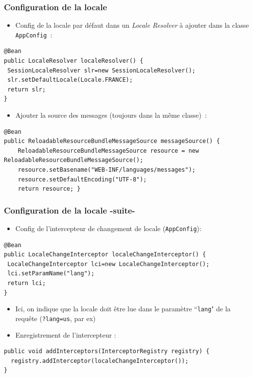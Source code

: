 \documentclass{beamer}
\begin{document}
\begin{frame}[fragile]
	\frametitle{Configuration de la locale}
	\begin{itemize}
		\item Config de la locale par défaut dans un \textit{Locale Resolver} à ajouter dans la classe \texttt{AppConfig}~:
\end{itemize}

\begin{lstlisting}
@Bean
public LocaleResolver localeResolver() {
 SessionLocaleResolver slr=new SessionLocaleResolver();
 slr.setDefaultLocale(Locale.FRANCE);
 return slr;
}
\end{lstlisting}
	\begin{itemize}
		
\item Ajouter la source des messages (toujours dans la même classe)~:
\end{itemize}

\begin{lstlisting}
@Bean
public ReloadableResourceBundleMessageSource messageSource() {
	ReloadableResourceBundleMessageSource resource = new ReloadableResourceBundleMessageSource();
	resource.setBasename("WEB-INF/languages/messages");
	resource.setDefaultEncoding("UTF-8");
	return resource; }
\end{lstlisting}
\end{frame} 

\begin{frame}[fragile]
	\frametitle{Configuration de la locale -suite-}
	\begin{itemize}
		\item Config de l'intercepteur de changement de locale (\texttt{AppConfig}):
\end{itemize}

\begin{lstlisting}
@Bean
public LocaleChangeInterceptor localeChangeInterceptor() {
 LocaleChangeInterceptor lci=new LocaleChangeInterceptor();
 lci.setParamName("lang");
 return lci;
}
\end{lstlisting}
	\begin{itemize}

\item[] Ici, on indique que la locale doit être lue dans le paramètre ``\texttt{lang}" de la requête (\texttt{?lang=us}, par ex)
\item Enregistrement de l'intercepteur :
	\end{itemize}

\begin{lstlisting}
public void addInterceptors(InterceptorRegistry registry) {
  registry.addInterceptor(localeChangeInterceptor());
}
\end{lstlisting}
\end{frame} 
\end{document}
